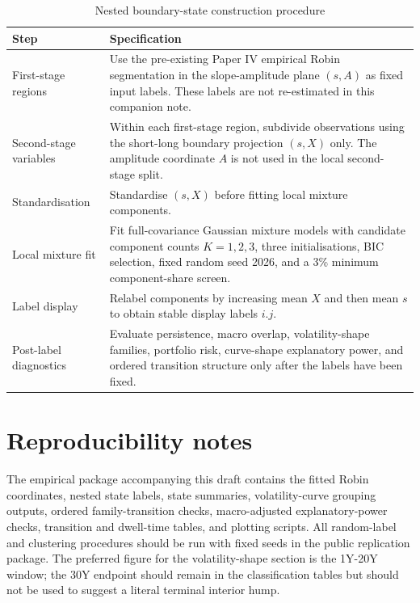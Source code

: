 \documentclass[11pt]{article}
\begin{document}
\begin{table}[H]
\centering
\small
\begin{tabularx}{\textwidth}{p{}X}
\toprule
Step & Specification \\
\midrule
First-stage regions & Use the pre-existing Paper IV empirical Robin segmentation in the slope-amplitude plane $(s,A)$ as fixed input labels. These labels are not re-estimated in this companion note. \\
Second-stage variables & Within each first-stage region, subdivide observations using the short-long boundary projection $(s,X)$ only. The amplitude coordinate $A$ is not used in the local second-stage split. \\
Standardisation & Standardise $(s,X)$ before fitting local mixture components. \\
Local mixture fit & Fit full-covariance Gaussian mixture models with candidate component counts $K=1,2,3$, three initialisations, BIC selection, fixed random seed 2026, and a 3\% minimum component-share screen. \\
Label display & Relabel components by increasing mean $X$ and then mean $s$ to obtain stable display labels $i.j$. \\
Post-label diagnostics & Evaluate persistence, macro overlap, volatility-shape families, portfolio risk, curve-shape explanatory power, and ordered transition structure only after the labels have been fixed. \\
\bottomrule
\end{tabularx}
\caption{Nested boundary-state construction procedure}
\label{tab:state_construction_procedure}
\end{table}

\section{Reproducibility notes}

The empirical package accompanying this draft contains the fitted Robin coordinates, nested state labels, state summaries, volatility-curve grouping outputs, ordered family-transition checks, macro-adjusted explanatory-power checks, transition and dwell-time tables, and plotting scripts. All random-label and clustering procedures should be run with fixed seeds in the public replication package. The preferred figure for the volatility-shape section is the 1Y-20Y window; the 30Y endpoint should remain in the classification tables but should not be used to suggest a literal terminal interior hump.
\end{document}
